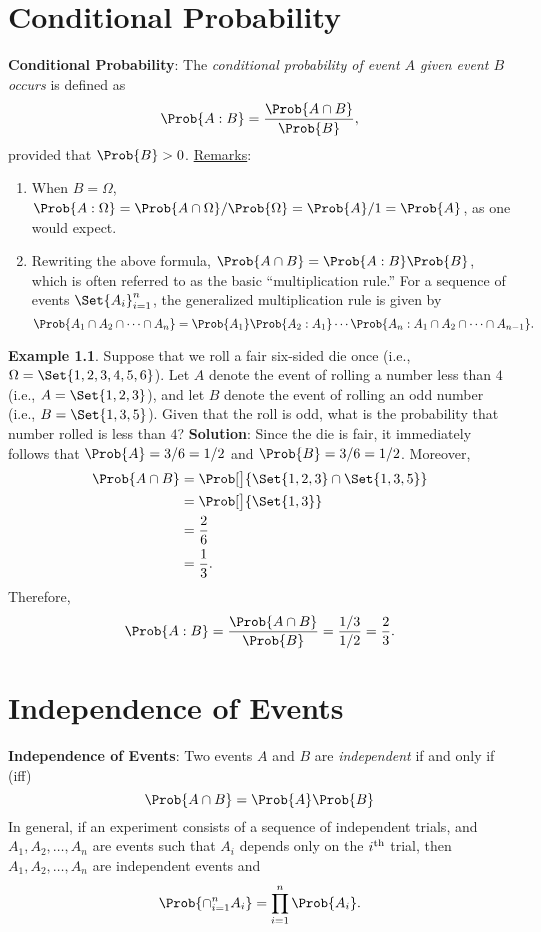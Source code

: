 \section*{Conditional Probability}
\begin{Regular}
    \textbf{Conditional Probability}: The \emph{conditional probability of event $ A $ given event $ B $ occurs} is defined as
    \[ \Prob{A\given B}=\frac{\Prob{A\cap B}}{\Prob{B}},  \]
    provided that $ \Prob{B}>0 $.
    \tcblower{}
    \underline{Remarks}:
    \begin{enumerate}[(1)]
        \item When $ B=\Omega $, $ \Prob{A\given \Omega}=\Prob{A\cap \Omega}/\Prob{\Omega}=\Prob{A}/1=\Prob{A} $, as one would expect.
        \item Rewriting the above formula, $ \Prob{A\cap B}=\Prob{A\given B}\Prob{B} $, which is often referred to as the basic ``multiplication rule.''
              For a sequence of events $ \Set{A_i}_{i=1}^n $, the generalized multiplication rule is given by
              \[ \Prob{A_1\cap A_2\cap\cdots\cap A_n}=\Prob{A_1}\Prob{A_2\given A_1}\cdots\Prob{A_n\given A_1\cap A_2\cap\cdots\cap A_{n-1}}. \]
    \end{enumerate}
\end{Regular}
\begin{Example}
    \textbf{Example 1.1}. Suppose that we roll a fair six-sided die once (i.e., $ \Omega=\Set{1,2,3,4,5,6} $). Let $ A $
    denote the event of rolling a number less than $ 4 $ (i.e., $ A=\Set{1,2,3} $), and let $ B $ denote the
    event of rolling an odd number (i.e., $ B=\Set{1,3,5} $). Given that the roll is odd, what is the
    probability that number rolled is less than $ 4 $?
    \tcblower{}
    \textbf{Solution}: Since the die is fair, it immediately follows that
    $ \Prob{A}=3/6=1/2 $ and $ \Prob{B}=3/6=1/2 $. Moreover,
    \begin{align}
        \Prob{A\cap B}
         & =\Prob[\big]{\Set{1,2,3}\cap\Set{1,3,5}} \\
         & =\Prob[\big]{\Set{1,3}}                  \\
         & =\frac{2}{6}                             \\
         & =\frac{1}{3}.
    \end{align}
    Therefore,
    \[ \Prob{A\given B}=\frac{\Prob{A\cap B}}{\Prob{B}}=\frac{1/3}{1/2}=\frac{2}{3}. \]
\end{Example}
\section*{Independence of Events}
\begin{Regular}
    \textbf{Independence of Events}: Two events $ A $ and $ B $ are \emph{independent} if and only if (iff)
    \[ \Prob{A\cap B}=\Prob{A}\Prob{B} \]
    In general, if an experiment consists of a sequence of independent trials, and $ A_1,A_2,\ldots,A_n $ are
    events such that $ A_i $ depends only on the $ i\textsuperscript{th} $ trial, then $ A_1,A_2,\ldots,A_n $ are independent
    events and
    \[ \Prob{\cap_{i=1}^n A_i}=\prod_{i=1}^n\Prob{A_i}. \]
\end{Regular}
